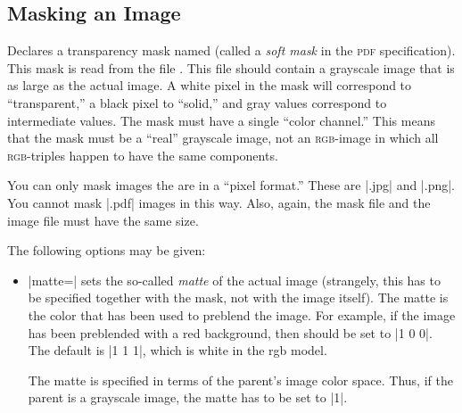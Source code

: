 \subsection{Masking an Image}


\begin{command}{\pgfdeclaremask{}}
  Declares a transparency mask named  (called a
  \emph{soft mask} in the \textsc{pdf} specification). This mask is
  read from the file . This file should contain a
  grayscale image that is as large as the actual image. A white
  pixel in the mask will correspond to ``transparent,'' a black pixel
  to ``solid,'' and gray values correspond to intermediate values. The
  mask must have a single ``color channel.'' This means that the
  mask must be a ``real'' grayscale image, not an \textsc{rgb}-image
  in which all \textsc{rgb}-triples happen to have the same
  components.

  You can only mask images the are in a ``pixel format.'' These are
  |.jpg| and |.png|.  You cannot mask |.pdf| images in this way. Also,
  again, the mask file and the image file must have the same size.

  The following options may be given:
  \begin{itemize}
  \item |matte=| sets the so-called
    \emph{matte} of the actual image (strangely, this has to be
    specified together with the mask, not with the image itself). The
    matte is the color that has been used to preblend the image. For
    example, if the image has been preblended with a red background,
    then  should be set to |{1 0 0}|. The
    default is |{1 1 1}|, which is white in the rgb model.

    The matte is specified in terms of the parent's image color
    space. Thus, if the parent is a grayscale image, the matte has to
    be set to |{1}|.
  \end{itemize}
  \example
\begin{codeexample}[]
\hbox{\hskip-14cm\hskip1cm
\hskip1cm
\hskip1cm
}
\end{codeexample}
\end{command}

